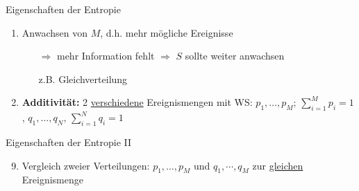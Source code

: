 \begin{prop}{Eigenschaften der Entropie}
\begin{enumerate}
\begin{itemize}
    \end{itemize}
    \item Anwachsen von $M$, d.h. mehr mögliche Ereignisse
    \begin{itemize}
        \item[$\Rightarrow$] mehr Information fehlt $\Rightarrow$ $S$ sollte weiter anwachsen
        \item[] z.B. Gleichverteilung
    \end{itemize}
    \item \textbf{Additivität:} 2 \underline{verschiedene} Ereignismengen mit WS: $p_1, \dots, p_M; \, \sum_{i=1}^M p_i = 1$, $q_1, \dots, q_N, \, \sum_{i=1}^N q_i = 1$
\end{enumerate}
\end{prop}
\begin{prop}{Eigenschaften der Entropie II} 
\begin{enumerate}
    \setcounter{enumi}{8}
    \begin{itemize}
        \item \underline{unabhängige Ereignisse}: $P_{ij} = p_i \cdot q_j$
        \begin{align}
            S(\{P_{ij}\}) &=  - k \ \sum_{i,j} \ P_{ij} \ ln(P_{ij}) \\
            &= - k \ \sum_{i,j} \ p_i q_j \ \underbrace{ln(p_iq_j)}_{ln(p_i) + ln(q_j)} \\
            &\rightarrow \text{eine Summe ausführbar + Normierung} \\
            &= - k \ \Bigl(\sum_i \ p_i \ ln(p_i) + \sum_j \ q_j \ ln(q_j) \Bigr)\\
            &= S(\{p_i\}) + S(\{q_j\})
        \end{align}
        Mangel an Information addiert sich.
        \item \underline{korrelierte Ereignisse}\footnote{\textbf{Intuition:} Korrelation kann beispielsweise sein: Bücher im Schrank sind nach Farbe sortiert. Dann gibt es bereits Information über dieses System: Wie die Farbe eines bestimmten Buches mit seinem Aufenthaltsort zusammenhängen.}: $P_{ij} \neq p_i q_j$
        \begin{equation}
            \Rightarrow \: S(\{P_{ij}\}) < S(\{p_i\}) + S(\{q_j\})
        \end{equation}
    \end{itemize}
    \item Vergleich zweier Verteilungen: $p_1,\dots, p_M$ und $q_1,\cdots,q_M$ zur \underline{gleichen} Ereignismenge

\end{enumerate}
\end{prop}
